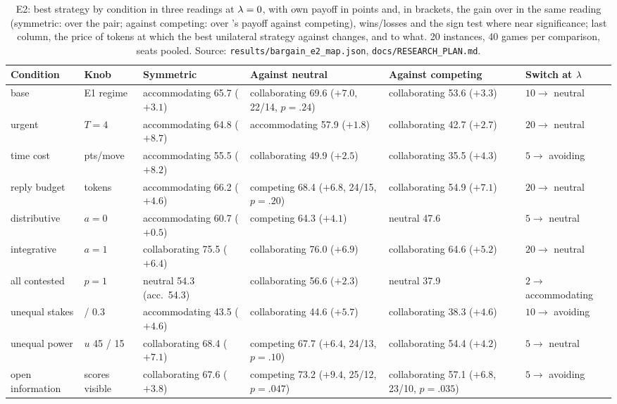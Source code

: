 \begin{table}[t]
\caption{E2: best strategy by condition in three readings at $\lambda=0$, with own payoff in points and, in brackets, the gain over \neutral{} in the same reading (symmetric: over the \neutral{} pair; against competing: over \neutral's payoff against competing), wins/losses and the sign test where near significance; last column, the price of tokens at which the best unilateral strategy against \neutral{} changes, and to what. 20 instances, 40 games per comparison, seats pooled. Source: \texttt{results/bargain\_e2\_map.json}, \texttt{docs/RESEARCH\_PLAN.md}.}
\label{tab:map}
\centering\scriptsize\setlength{\tabcolsep}{3pt}
\begin{tabular}{@{}>{\raggedright\arraybackslash}p{1.9cm}>{\raggedright\arraybackslash}p{1.7cm}>{\raggedright\arraybackslash}p{3.1cm}>{\raggedright\arraybackslash}p{3.9cm}>{\raggedright\arraybackslash}p{3.4cm}>{\raggedright\arraybackslash}p{1.9cm}@{}}
\toprule
Condition & Knob & Symmetric & Against neutral & Against competing & Switch at $\lambda$ \\
\midrule
base & E1 regime & accommodating 65.7 ($+3.1$) & collaborating 69.6 ($+7.0$, 22/14, $p{=}.24$) & collaborating 53.6 ($+3.3$) & $10 \to$ neutral \\
urgent & $T{=}4$ & accommodating 64.8 ($+8.7$) & accommodating 57.9 ($+1.8$) & collaborating 42.7 ($+2.7$) & $20 \to$ neutral \\
time cost & 3 pts/move & accommodating 55.5 ($+8.2$) & collaborating 49.9 ($+2.5$) & collaborating 35.5 ($+4.3$) & $5 \to$ avoiding \\
reply budget & 250 tokens & accommodating 66.2 ($+4.6$) & competing 68.4 ($+6.8$, 24/15, $p{=}.20$) & collaborating 54.9 ($+7.1$) & $20 \to$ neutral \\
distributive & $a{=}0$ & accommodating 60.7 ($+0.5$) & competing 64.3 ($+4.1$) & neutral 47.6 & $5 \to$ neutral \\
integrative & $a{=}1$ & collaborating 75.5 ($+6.4$) & collaborating 76.0 ($+6.9$) & collaborating 64.6 ($+5.2$) & $20 \to$ neutral \\
all contested & $p{=}1$ & neutral 54.3 (acc.\ 54.3) & collaborating 56.6 ($+2.3$) & neutral 37.9 & $2 \to$ accommodating \\
unequal stakes & 1 / 0.3 & accommodating 43.5 ($+4.6$) & collaborating 44.6 ($+5.7$) & collaborating 38.3 ($+4.6$) & $10 \to$ avoiding \\
unequal power & $u$ 45 / 15 & collaborating 68.4 ($+7.1$) & competing 67.7 ($+6.4$, 24/13, $p{=}.10$) & collaborating 54.4 ($+4.2$) & $5 \to$ neutral \\
open information & scores visible & collaborating 67.6 ($+3.8$) & competing 73.2 ($+9.4$, 25/12, $p{=}.047$) & collaborating 57.1 ($+6.8$, 23/10, $p{=}.035$) & $5 \to$ avoiding \\
\bottomrule
\end{tabular}
\end{table}

